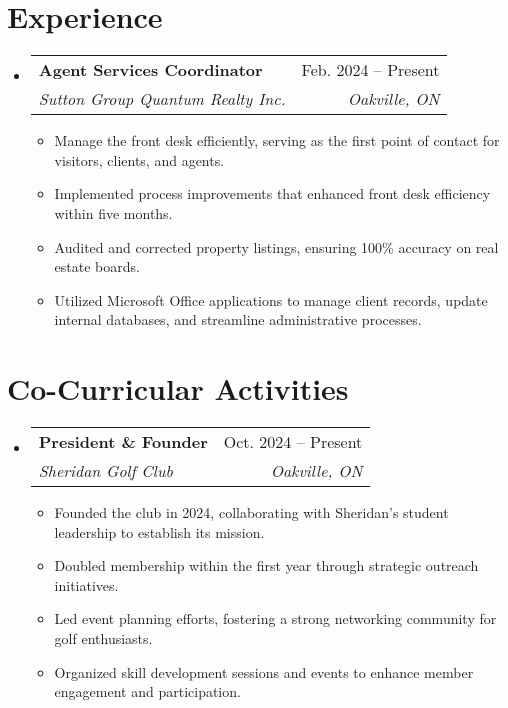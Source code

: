 \documentclass[letterpaper,11pt]{article}
\makeatletter
\newcommand{\resumeItem}[1]{
  \item\small{
    {#1 \vspace{-2pt}}
  }
}
\newcommand{\resumeSubheading}[4]{
  \vspace{-2pt}\item
    \begin{tabular*}{0.97\textwidth}[t]{l@{\extracolsep{\fill}}r}
      \textbf{#1} & #2 \\
      \textit{\small#3} & \textit{\small #4} \\
    \end{tabular*}\vspace{-7pt}
}
\newcommand{\resumeSubHeadingListStart}{\begin{itemize}[leftmargin=0.15in, label={}]}
\newcommand{\resumeSubHeadingListEnd}{\end{itemize}}
\newcommand{\resumeItemListStart}{\begin{itemize}}
\newcommand{\resumeItemListEnd}{\end{itemize}\vspace{-5pt}}
\makeatother
\begin{document}
\section{Experience}
\resumeSubHeadingListStart

    \resumeSubheading
        { Agent Services Coordinator }
        { Feb. 2024 – Present }
        { Sutton Group Quantum Realty Inc. }
        { Oakville, ON }
    \resumeItemListStart
        
            \resumeItem{ Manage the front desk efficiently, serving as the first point of contact for visitors, clients, and agents. }
        
            \resumeItem{ Implemented process improvements that enhanced front desk efficiency within five months. }
        
            \resumeItem{ Audited and corrected property listings, ensuring 100\% accuracy on real estate boards. }
        
            \resumeItem{ Utilized Microsoft Office applications to manage client records, update internal databases, and streamline administrative processes. }
        
    \resumeItemListEnd

\resumeSubHeadingListEnd



\section{Co-Curricular Activities}
\resumeSubHeadingListStart

    \resumeSubheading
        { President \& Founder }
        { Oct. 2024 – Present }
        { Sheridan Golf Club }
        { Oakville, ON }
    \resumeItemListStart
        
            \resumeItem{ Founded the club in 2024, collaborating with Sheridan’s student leadership to establish its mission. }
        
            \resumeItem{ Doubled membership within the first year through strategic outreach initiatives. }
        
            \resumeItem{ Led event planning efforts, fostering a strong networking community for golf enthusiasts. }
        
            \resumeItem{ Organized skill development sessions and events to enhance member engagement and participation. }
        
    \resumeItemListEnd

\resumeSubHeadingListEnd
\end{document}

